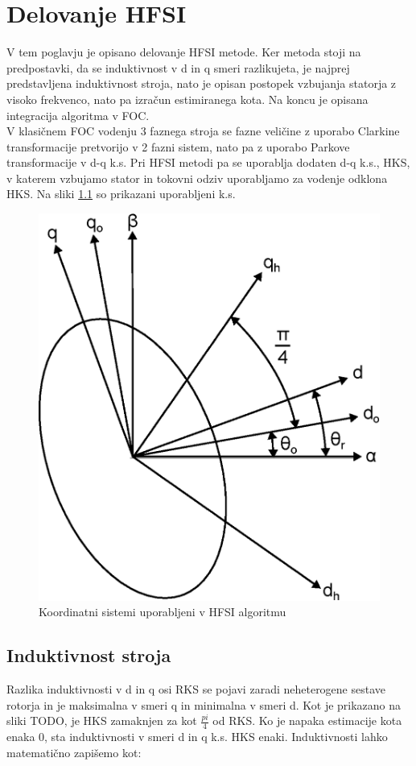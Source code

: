 \documentclass[a4paper,twoside,openright,12pt,slovene]{book}
\begin{document}
\chapter{Delovanje HFSI} \label{teorija}


V tem poglavju je opisano delovanje HFSI metode. Ker metoda stoji na predpostavki, da se induktivnost v d in q smeri razlikujeta, je najprej predstavljena induktivnost stroja, nato je
opisan postopek vzbujanja statorja z visoko frekvenco, nato pa izračun estimiranega kota. Na koncu je opisana integracija algoritma v FOC.
\\
V klasičnem FOC vodenju 3 faznega stroja se fazne veličine z uporabo Clarkine transformacije pretvorijo v 2 fazni sistem, nato pa z uporabo Parkove transformacije v d-q k.s. Pri HFSI metodi pa se
uporablja dodaten d-q k.s., HKS, v katerem vzbujamo stator in tokovni odziv uporabljamo za vodenje odklona HKS. Na sliki \ref{koordinatniSistem} so prikazani uporabljeni k.s.

\begin{figure}[!htbp]
    \centering
    \includegraphics[width=0.75\columnwidth]{Slike/Inkscape/koordinatniSistem.eps}
    \caption{\label{koordinatniSistem} Koordinatni sistemi uporabljeni v HFSI algoritmu}
\end{figure}

\section{Induktivnost stroja}
Razlika induktivnosti v d in q osi RKS se pojavi zaradi neheterogene sestave rotorja in je maksimalna v smeri q in minimalna v smeri d. Kot je prikazano na sliki TODO, je
HKS zamaknjen za kot $\frac{pi}{4}$ od RKS. Ko je napaka estimacije kota enaka 0, sta induktivnosti v smeri d in q k.s. HKS enaki. Induktivnosti lahko matematično zapišemo kot:
\end{document}
